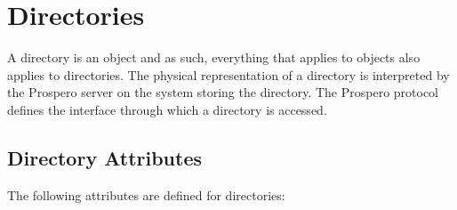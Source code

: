 \section{Directories}

A directory is an object and as such, everything that applies to
objects also applies to directories.  The physical representation of
a directory is interpreted by the Prospero server on the system
storing the directory.  The Prospero protocol defines the interface
through which a directory is accessed.

\subsection{Directory Attributes}

The following attributes are defined for directories:

